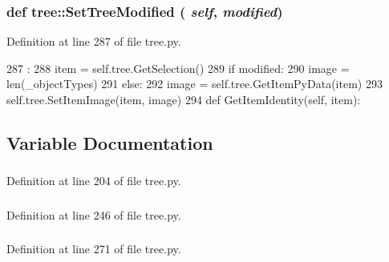 \hypertarget{namespacetree_aa3a4caf6d16485c48ec72b863be84b31}{
\subsubsection[{SetTreeModified}]{\setlength{\rightskip}{0pt plus 5cm}def tree::SetTreeModified ( {\em self}, \/   {\em modified})}}
\label{namespacetree_aa3a4caf6d16485c48ec72b863be84b31}


Definition at line 287 of file tree.py.


\begin{DoxyCode}
287                                        :
288         item = self.tree.GetSelection()
289         if modified:
290             image = len(_objectTypes)
291         else:
292             image = self.tree.GetItemPyData(item)
293         self.tree.SetItemImage(item, image)
294 
    def GetItemIdentity(self, item):
\end{DoxyCode}


\subsection{Variable Documentation}
\hypertarget{namespacetree_a2169f3aaac3e182d20ba5af0f5450cd6}{
\subsubsection[{item}]{}}
\label{namespacetree_a2169f3aaac3e182d20ba5af0f5450cd6}


Definition at line 204 of file tree.py.\hypertarget{namespacetree_ac3a21525804e0802174c4f4e12187e66}{
\subsubsection[{root}]{}}
\label{namespacetree_ac3a21525804e0802174c4f4e12187e66}


Definition at line 246 of file tree.py.\hypertarget{namespacetree_a68d26aeb2ad43a1c46091dcbeb4c4e4d}{
\subsubsection[{TreeItem}]{}}
\label{namespacetree_a68d26aeb2ad43a1c46091dcbeb4c4e4d}


Definition at line 271 of file tree.py.